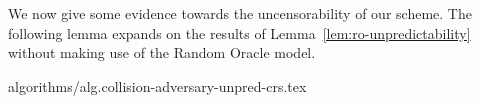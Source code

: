 We now give some evidence towards the uncensorability of our scheme.
%
%
%
%
The following lemma expands on the results of Lemma~\ref{lem:ro-unpredictability} without making use of the Random Oracle model.

{algorithms/alg.collision-adversary-unpred-crs.tex}

\newcommand{\collstar}{\textsc{Coll}_{h^*}}

